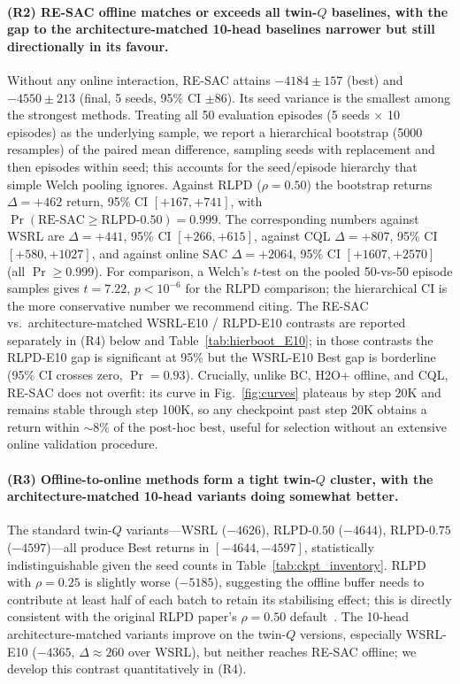 \documentclass[journal,10pt]{IEEEtran}
\begin{document}
\paragraph{(R2) RE-SAC offline matches or exceeds all twin-$Q$ baselines, with the gap to the architecture-matched 10-head baselines narrower but still directionally in its favour.} Without any online interaction, RE-SAC attains $-4184 \pm 157$ (best) and $-4550 \pm 213$ (final, 5 seeds, 95\% CI $\pm 86$). Its seed variance is the smallest among the strongest methods. Treating all 50 evaluation episodes (5 seeds $\times$ 10 episodes) as the underlying sample, we report a hierarchical bootstrap (5000 resamples) of the paired mean difference, sampling seeds with replacement and then episodes within seed; this accounts for the seed/episode hierarchy that simple Welch pooling ignores. Against RLPD ($\rho=0.50$) the bootstrap returns $\Delta = +462$ return, 95\% CI $[+167, +741]$, with $\Pr(\text{RE-SAC} \geq \text{RLPD-}0.50) = 0.999$. The corresponding numbers against WSRL are $\Delta = +441$, 95\% CI $[+266, +615]$, against CQL $\Delta = +807$, 95\% CI $[+580, +1027]$, and against online SAC $\Delta = +2064$, 95\% CI $[+1607, +2570]$ (all $\Pr \geq 0.999$). For comparison, a Welch's $t$-test on the pooled 50-vs-50 episode samples gives $t=7.22$, $p<10^{-6}$ for the RLPD comparison; the hierarchical CI is the more conservative number we recommend citing. The RE-SAC vs.\ architecture-matched WSRL-E10 / RLPD-E10 contrasts are reported separately in (R4) below and Table~\ref{tab:hierboot_E10}; in those contrasts the RLPD-E10 gap is significant at 95\% but the WSRL-E10 Best gap is borderline (95\% CI crosses zero, $\Pr\!=\!0.93$). Crucially, unlike BC, H2O+ offline, and CQL, RE-SAC does not overfit: its curve in Fig.~\ref{fig:curves} plateaus by step 20K and remains stable through step 100K, so any checkpoint past step 20K obtains a return within $\sim$8\% of the post-hoc best, useful for selection without an extensive online validation procedure.

\paragraph{(R3) Offline-to-online methods form a tight twin-$Q$ cluster, with the architecture-matched 10-head variants doing somewhat better.} The standard twin-$Q$ variants---WSRL ($-4626$), RLPD-$0.50$ ($-4644$), RLPD-$0.75$ ($-4597$)---all produce Best returns in $[-4644, -4597]$, statistically indistinguishable given the seed counts in Table~\ref{tab:ckpt_inventory}. RLPD with $\rho = 0.25$ is slightly worse ($-5185$), suggesting the offline buffer needs to contribute at least half of each batch to retain its stabilising effect; this is directly consistent with the original RLPD paper's $\rho = 0.50$ default~\cite{ball2023efficient}. The 10-head architecture-matched variants improve on the twin-$Q$ versions, especially WSRL-E10 ($-4365$, $\Delta\!\approx\!260$ over WSRL), but neither reaches RE-SAC offline; we develop this contrast quantitatively in (R4).
\end{document}

